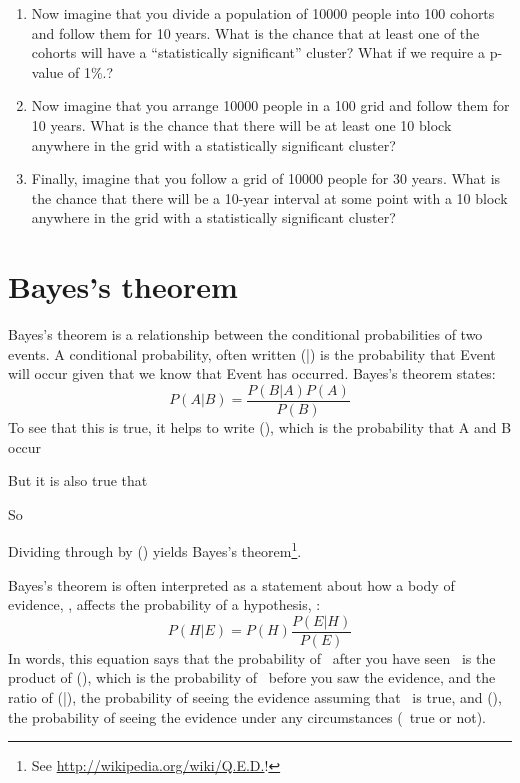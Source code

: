 \documentclass[12pt]{book}
\begin{document}
\begin{exercise}
\begin{enumerate}
\item Now imagine that you divide a population of 10000 people into 100
  cohorts and follow them for 10 years.  What is the chance that at
  least one of the cohorts will have a ``statistically significant''
  cluster?  What if we require a p-value of 1\%.?

\item Now imagine that you arrange 10000 people in a 100 
  grid and follow them for 10 years.  What is the chance that there
  will be at least one 10  block anywhere in the grid
  with a statistically significant cluster?

\item Finally, imagine that you follow a grid of 10000 people for 30
  years.  What is the chance that there will be a 10-year interval
  at some point with a 10  block anywhere in the grid
  with a statistically significant cluster?

\end{enumerate}

\end{exercise}



\section{Bayes's theorem}

Bayes's theorem is a relationship between the conditional probabilities
of two events.  A conditional probability, often written \Prob(\A|\B) is
the probability that Event \A will occur given that we know that
Event \B has occurred.  Bayes's theorem states:
%
\[ P(A|B) = \frac{P(B|A)P(A)}{P(B)} \]
%
To see that this is true, it helps to write \Prob(\A \AND \B), which
is the probability that A and B occur

\Eqn{ \Prob(\A \AND \B) = \Prob(\A) \Prob(\B|\A) }

But it is also true that 

\Eqn{ \Prob(\A \AND \B) = \Prob(\B) \Prob(\A|\B) }

So

\Eqn{ \Prob(\B) \Prob(\A|\B) = \Prob(\A) \Prob(\B|\A) }

Dividing through by \Prob(\B) yields Bayes's theorem\footnote{See
\url{http://wikipedia.org/wiki/Q.E.D.}!}.

Bayes's theorem is often interpreted as a statement about 
how a body of evidence, \E, affects the probability of a 
hypothesis, \HH:
%
\[ P(H|E) = P(H) \frac{P(E|H)}{P(E)} \]
%
In words, this equation says that the probability of \HH~after you
have seen \E~is the product of \Prob(\HH), which is the probability of
\HH~before you saw the evidence, and the ratio of \Prob(\E|\HH), the
probability of seeing the evidence assuming that \HH~is true, and
\Prob(\E), the probability of seeing the evidence under any circumstances
(\HH~true or not).
\end{document}

